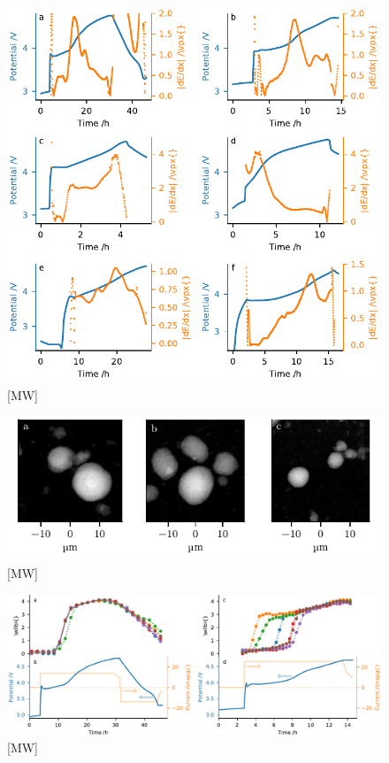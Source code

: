 \documentclass{article}
\begin{document}
\begin{figure}
  \includegraphics{figures/echem-derivatives.pdf}
  \caption{[MW] }
\end{figure}

\begin{figure}
  \includegraphics{figures/OD-frames.pdf}
  \caption{[MW] }
\end{figure}

\begin{figure}
  \includegraphics{figures/NMC333-particle-echem.pdf}
  \caption{[MW] }
\end{figure}
\end{document}
